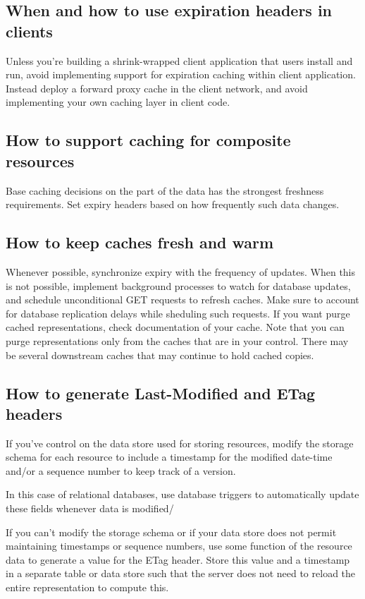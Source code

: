 \documentclass[11pt,a4paper]{article}
\begin{document}
\subsection{When and how to use expiration headers in clients}
Unless you're building a shrink-wrapped client application that users install and run, avoid implementing support for expiration caching within client application. Instead deploy a forward proxy cache in the client network, and avoid implementing your own caching layer in client code.

\subsection{How to support caching for composite resources}
Base caching decisions on the part of the data has the strongest freshness requirements. Set expiry headers based on how frequently such data changes.

\subsection{How to keep caches fresh and warm}
Whenever possible, synchronize expiry with the frequency of updates. When this is not possible, implement background processes to watch for database updates, and schedule unconditional GET requests to refresh caches. Make sure to account for database replication delays while sheduling such requests. If you want purge cached representations, check documentation of your cache. Note that you can purge representations only from the caches that are in your control. There may be several downstream caches that may continue to hold cached copies.

\subsection{How to generate Last-Modified and ETag headers}
If you've control on the data store used for storing resources, modify the storage schema for each resource to include a timestamp for the modified date-time and/or a sequence number to keep track of a version.

In this case of relational databases, use database triggers to automatically update these fields whenever data is modified/

If you can't modify the storage schema or if your data store does not permit maintaining timestamps or sequence numbers, use some function of the resource data to generate a value for the ETag header. Store this value and a timestamp in a separate table or data store such that the server does not need to reload the entire representation to compute this.
\end{document}
